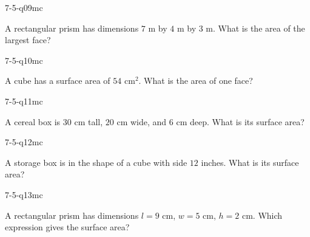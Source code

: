 \begin{practiceQuestion}{7-5-q09}{mc}
\begin{questionText}
A rectangular prism has dimensions $7$ m by $4$ m by $3$ m. What is the area of the largest face?
\end{questionText}
\end{practiceQuestion}

\begin{practiceQuestion}{7-5-q10}{mc}
\begin{questionText}
A cube has a surface area of $54$ cm$^2$. What is the area of one face?
\end{questionText}
\end{practiceQuestion}

\begin{practiceQuestion}{7-5-q11}{mc}
\begin{questionText}
A cereal box is $30$ cm tall, $20$ cm wide, and $6$ cm deep. What is its surface area?
\end{questionText}
\end{practiceQuestion}

\begin{practiceQuestion}{7-5-q12}{mc}
\begin{questionText}
A storage box is in the shape of a cube with side $12$ inches. What is its surface area?
\end{questionText}
\end{practiceQuestion}

\begin{practiceQuestion}{7-5-q13}{mc}
\begin{questionText}
A rectangular prism has dimensions $l = 9$ cm, $w = 5$ cm, $h = 2$ cm. Which expression gives the surface area?
\end{questionText}
\end{practiceQuestion}

